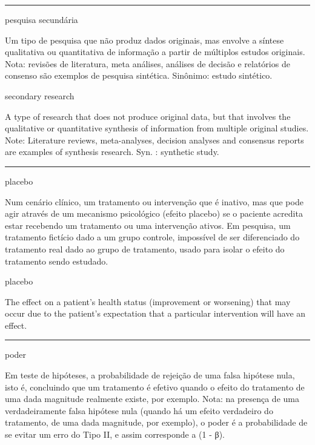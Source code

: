 \documentclass[
]{book}
\begin{document}
\begin{center}\rule{0.5\linewidth}{0.5pt}\end{center}

pesquisa secundária

Um tipo de pesquisa que não produz dados originais, mas envolve a síntese qualitativa ou quantitativa de informação a partir de múltiplos estudos originais. Nota: revisões de literatura, meta análises, análises de decisão e relatórios de consenso são exemplos de pesquisa sintética. Sinônimo: estudo sintético.

secondary research

A type of research that does not produce original data, but that involves the qualitative or quantitative synthesis of information from multiple original studies. Note: Literature reviews, meta-analyses, decision analyses and consensus reports are examples of synthesis research. Syn. : synthetic study.

\begin{center}\rule{0.5\linewidth}{0.5pt}\end{center}

placebo

Num cenário clínico, um tratamento ou intervenção que é inativo, mas que pode agir através de um mecanismo psicológico (efeito placebo) se o paciente acredita estar recebendo um tratamento ou uma intervenção ativos. Em pesquisa, um tratamento fictício dado a um grupo controle, impossível de ser diferenciado do tratamento real dado ao grupo de tratamento, usado para isolar o efeito do tratamento sendo estudado.

placebo

The effect on a patient's health status (improvement or worsening) that may occur due to the patient's expectation that a particular intervention will have an effect.

\begin{center}\rule{0.5\linewidth}{0.5pt}\end{center}

poder

Em teste de hipóteses, a probabilidade de rejeição de uma falsa hipótese nula, isto é, concluindo que um tratamento é efetivo quando o efeito do tratamento de uma dada magnitude realmente existe, por exemplo. Nota: na presença de uma verdadeiramente falsa hipótese nula (quando há um efeito verdadeiro do tratamento, de uma dada magnitude, por exemplo), o poder é a probabilidade de se evitar um erro do Tipo II, e assim corresponde a (1 - β).
\end{document}
